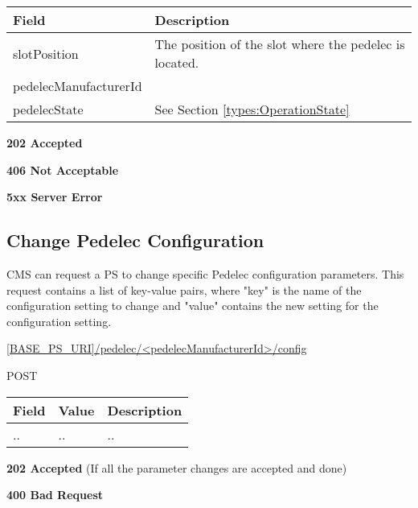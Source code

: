 \begin{table}[!h]
\vspace{-7mm}
\begin{tabularx}{\linewidth}{ | l | X | }
  \hline
  \rowcolor{table-head}
  Field & Description \\
  \hline
  slotPosition	& The position of the slot where the pedelec is located. \\
  pedelecManufacturerId		&  \\
  pedelecState 			& See Section \ref{types:OperationState} \\
  \hline
\end{tabularx}
\end{table}

 \textbf{202 Accepted}

 \textbf{406 Not Acceptable}

\textbf{5xx Server Error}

\subsection{Change Pedelec Configuration}
\label{cms:change-pedelec-conf}

\acs{CMS} can request a \acs{PS} to change specific Pedelec configuration parameters. This request contains a list of key-value pairs, where "key" is the name of the configuration setting to change and "value" contains the new setting for the configuration setting.

 \url{[BASE_PS_URI]/pedelec/<pedelecManufacturerId>/config}

 POST

\newpage
{} 
\begin{table}[!h]
\vspace{-7mm}
\begin{tabularx}{\linewidth}{ | l | l | X | }
  \hline
  \rowcolor{table-head}
  Field & Value & Description \\
  \hline
	.. & .. & .. \\
  \hline
\end{tabularx}
\end{table}

\textbf{202 Accepted} (If all the parameter changes are accepted and done)

 \textbf{400 Bad Request}

